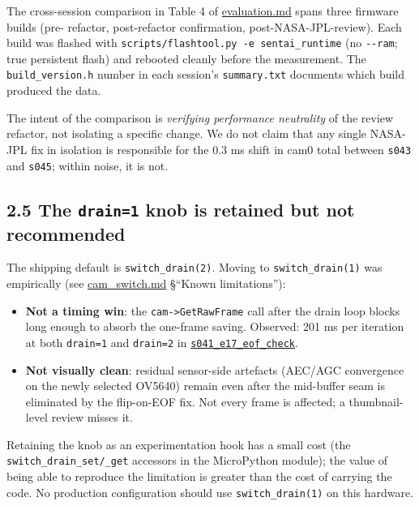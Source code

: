 The cross-session comparison in Table 4 of \url{evaluation.md} spans
three firmware builds (pre- refactor, post-refactor confirmation,
post-NASA-JPL-review). Each build was flashed with
\texttt{scripts/flashtool.py\ -e\ sentai\_runtime} (no \texttt{-\/-ram};
true persistent flash) and rebooted cleanly before the measurement. The
\texttt{build\_version.h} number in each session's \texttt{summary.txt}
documents which build produced the data.

The intent of the comparison is \emph{verifying performance neutrality}
of the review refactor, not isolating a specific change. We do not claim
that any single NASA-JPL fix in isolation is responsible for the 0.3 ms
shift in cam0 total between \texttt{s043} and \texttt{s045}; within
noise, it is not.

\subsection{\texorpdfstring{2.5 The \texttt{drain=1} knob is retained
but not
recommended}{2.5 The drain=1 knob is retained but not recommended}}\label{the-drain1-knob-is-retained-but-not-recommended}

The shipping default is \texttt{switch\_drain(2)}. Moving to
\texttt{switch\_drain(1)} was empirically (see \url{cam_switch.md}
§``Known limitations''):

\begin{itemize}
\tightlist
\item
  \textbf{Not a timing win}: the \texttt{cam-\textgreater{}GetRawFrame}
  call after the drain loop blocks long enough to absorb the one-frame
  saving. Observed: 201 ms per iteration at both \texttt{drain=1} and
  \texttt{drain=2} in
  \href{../experiments/s041_e17_eof_check/}{\texttt{s041\_e17\_eof\_check}}.
\item
  \textbf{Not visually clean}: residual sensor-side artefacts (AEC/AGC
  convergence on the newly selected OV5640) remain even after the
  mid-buffer seam is eliminated by the flip-on-EOF fix. Not every frame
  is affected; a thumbnail-level review misses it.
\end{itemize}

Retaining the knob as an experimentation hook has a small cost (the
\texttt{switch\_drain\_set/\_get} accessors in the MicroPython module);
the value of being able to reproduce the limitation is greater than the
cost of carrying the code. No production configuration should use
\texttt{switch\_drain(1)} on this hardware.

